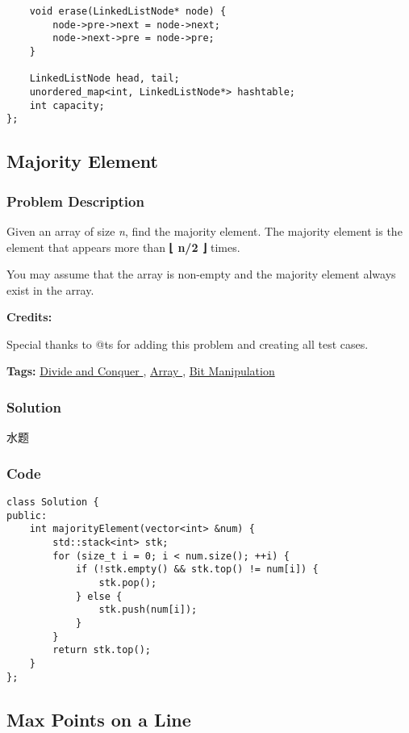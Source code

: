 \documentclass{article}
\begin{document}
\begin{CJK*}{UTF8}{gkai}
\begin{lstlisting}
    void erase(LinkedListNode* node) {
        node->pre->next = node->next;
        node->next->pre = node->pre;
    }
    
    LinkedListNode head, tail;
    unordered_map<int, LinkedListNode*> hashtable;
    int capacity;
};

\end{lstlisting}


\subsection{ Majority Element }
\label{ Majority Element }

\subsubsection*{Problem Description}
Given an array of size \emph{n}, find the majority element. The majority element is the element that appears more than \textbf{⌊ n/2 ⌋} times.

You may assume that the array is non-empty and the majority element always exist in the array.

\textbf{Credits:}

Special thanks to @ts for adding this problem and creating all test cases.


\textbf{Tags: }
\hyperref[ Divide and Conquer ]{ Divide and Conquer },  \hyperref[ Array ]{ Array },  \hyperref[ Bit Manipulation ]{ Bit Manipulation }



\subsubsection*{Solution}
水题

\subsubsection*{Code}
\begin{lstlisting}
class Solution {
public:
    int majorityElement(vector<int> &num) {
        std::stack<int> stk;
        for (size_t i = 0; i < num.size(); ++i) {
            if (!stk.empty() && stk.top() != num[i]) {
                stk.pop();
            } else {
                stk.push(num[i]);
            }
        }
        return stk.top();
    }
}; 
\end{lstlisting}


\subsection{ Max Points on a Line }
\label{ Max Points on a Line }


\end{CJK*}
\end{document}
